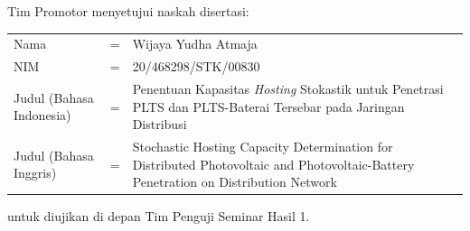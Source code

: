 {}
\vspace*{8pt}

\BgThispage

\noindent Tim Promotor menyetujui naskah disertasi:
\vspace*{-8pt}
{
\begin{longtable}{llp{264pt}}
	\hspace*{-11pt}Nama						& = & Wijaya Yudha Atmaja\\
	\hspace*{-11pt}NIM						& = & 20/468298/STK/00830\\
	\hspace*{-11pt}Judul (Bahasa Indonesia)	& = & Penentuan Kapasitas \textit{Hosting} Stokastik untuk Penetrasi PLTS dan PLTS-Baterai Tersebar pada Jaringan Distribusi\\
	\hspace*{-11pt}Judul	(Bahasa Inggris) 	& = & Stochastic Hosting Capacity Determination for Distributed Photovoltaic and Photovoltaic-Battery Penetration on Distribution Network
\end{longtable}
}
\vspace*{-22pt}
\noindent untuk diujikan di depan Tim Penguji Seminar Hasil 1.
\vspace*{5cm}

